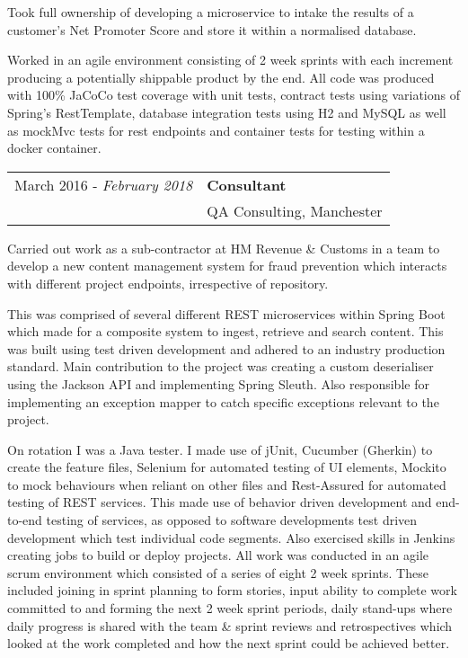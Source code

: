 Took full ownership of developing a microservice to intake the results of a customer's Net Promoter Score and store it within a normalised database. \newline

Worked in an agile environment consisting of 2 week sprints with each increment producing a potentially shippable product by the end. All code was produced with 100\% JaCoCo test coverage with unit tests, contract tests using variations of Spring’s RestTemplate, database integration tests using H2 and MySQL as well as mockMvc tests for rest endpoints and container tests for testing within a docker container.\newline
 
\smallskip
\begin{flushleft}
\begin{tabular}{r|l}
\indent March 2016 - \textit{February 2018} & \textbf{Consultant} \\
\indent & {\large{QA Consulting, Manchester}} \\
\end{tabular}
\end{flushleft}

Carried out work as a sub-contractor at HM Revenue \& Customs in a team to develop a new content management system for fraud prevention which interacts with different project endpoints, irrespective of repository. \newline

This was comprised of several different REST microservices within Spring Boot which made for a composite system to ingest, retrieve and search content. This was built using test driven development and adhered to an industry production standard. \newline \newline
    Main contribution to the project was creating a custom deserialiser using the Jackson API and implementing Spring Sleuth. Also responsible for implementing an exception mapper to catch specific exceptions relevant to the project. \newline
    
     On rotation I was a Java tester. I made use of jUnit, Cucumber (Gherkin) to create the feature files, Selenium for automated testing of UI elements, Mockito to mock behaviours when reliant on other files and 	Rest-Assured for automated testing of REST services. This made use of behavior driven development and end-to-end testing of services, as opposed to software developments test driven development which test individual code segments.
   	Also exercised skills in Jenkins creating jobs to build or deploy projects.\newline \newline
   	All work was conducted in an agile scrum environment which consisted of a series of eight 2 week sprints. These included joining in sprint planning to form stories, input ability to complete work committed to and forming the next 2 week sprint periods, daily stand-ups where daily progress is shared with the team \& sprint reviews and retrospectives which looked at the work completed and how the next sprint could be achieved better.\newline


